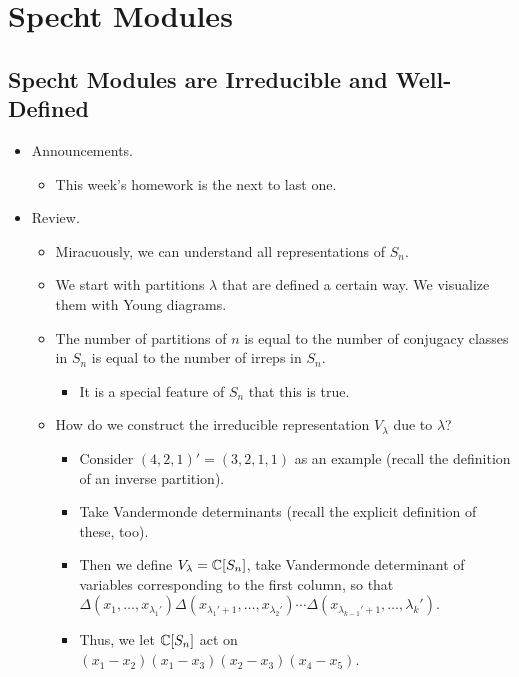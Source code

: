 \documentclass[../notes.tex]{subfiles}
\begin{document}
\chapter{Specht Modules}
\section{Specht Modules are Irreducible and Well-Defined}
\begin{itemize}
    \item {}Announcements.
    \begin{itemize}
        \item This week's homework is the next to last one.
    \end{itemize}
    \item Review.
    \begin{itemize}
        \item Miracuously, we can understand all representations of $S_n$.
        \item We start with partitions $\lambda$ that are defined a certain way. We visualize them with Young diagrams.
        \item The number of partitions of $n$ is equal to the number of conjugacy classes in $S_n$ is equal to the number of irreps in $S_n$.
        \begin{itemize}
            \item It is a special feature of $S_n$ that this is true.
        \end{itemize}
        \item How do we construct the irreducible representation $V_\lambda$ due to $\lambda$?
        \begin{itemize}
            \item Consider $(4,2,1)'=(3,2,1,1)$ as an example (recall the definition of an inverse partition).
            \item Take Vandermonde determinants (recall the explicit definition of these, too).
            \item Then we define $V_\lambda=\mathbb{C}[S_n]$, take Vandermonde determinant of variables corresponding to the first column, so that $\Delta(x_1,\dots,x_{\lambda_1'})\Delta(x_{\lambda_1'+1},\dots,x_{\lambda_2'})\cdots\Delta(x_{\lambda_{k-1}'+1},\dots,\lambda_k')$.
            \item Thus, we let $\mathbb{C}[S_n]$ act on $(x_1-x_2)(x_1-x_3)(x_2-x_3)(x_4-x_5)$.
        \end{itemize}
    \end{itemize}

\end{itemize}
\end{document}
